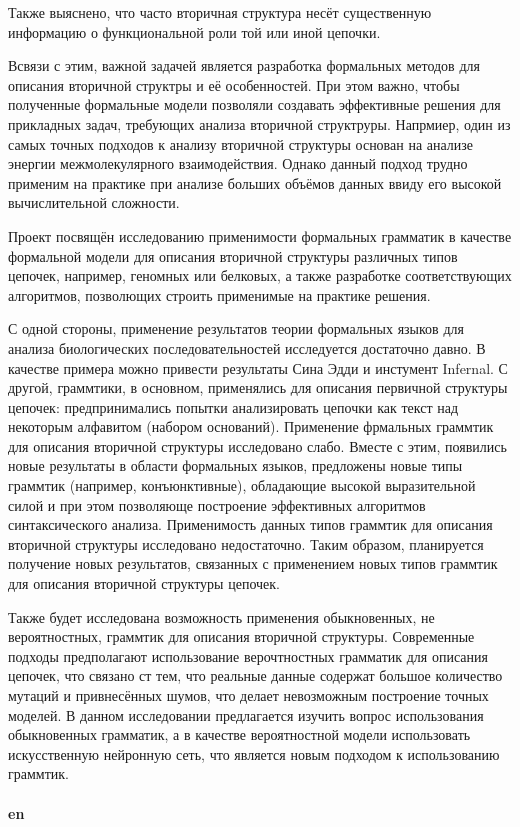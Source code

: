 \documentclass[12pt]{article}  %
\theoremstyle{remark}
\begin{document}
Также выяснено, что часто вторичная структура несёт существенную информацию о функциональной роли той или иной цепочки.

Всвязи с этим, важной задачей является разработка формальных методов для описания вторичной структры и её особенностей.
При этом важно, чтобы полученные формальные модели позволяли создавать эффективные решения для прикладных задач, требующих анализа вторичной структруры.
Напрмиер, один из самых точных подходов к анализу вторичной структуры основан на анализе энергии межмолекулярного взаимодействия.
Однако данный подход трудно применим на практике при анализе больших объёмов данных ввиду его высокой вычислительной сложности.

Проект посвящён исследованию применимости формальных грамматик в качестве формальной модели для описания вторичной структуры различных типов цепочек, например, геномных или белковых, а также разработке соответствующих алгоритмов, позволющих строить применимые на практике решения.

С одной стороны, применение результатов теории формальных языков для анализа биологических последовательностей исследуется достаточно давно.
В качестве примера можно привести результаты Сина Эдди и инстумент Infernal.
С другой, граммтики, в основном, применялись для описания первичной структуры цепочек: предпринимались попытки анализировать цепочки как текст над некоторым алфавитом (набором оснований).
Применение фрмальных граммтик для описания вторичной структуры исследовано слабо.
Вместе с этим, появились новые результаты в области формальных языков, предложены новые типы граммтик (например, конъюнктивные), обладающие высокой выразительной силой и при этом позволяюще построение эффективных алгоритмов синтаксического анализа.
Применимость данных типов граммтик для описания вторичной структуры исследовано недостаточно.
Таким образом, планируется получение новых результатов, связанных с применением новых типов граммтик для описания вторичной структуры цепочек.

Также будет исследована возможность применения обыкновенных, не вероятностных, граммтик для описания вторичной структуры.
Современные подходы предполагают использование верочтностных грамматик для описания цепочек, что связано ст тем, что реальные данные содержат большое количество мутаций и привнесённых шумов, что делает невозможным построение точных моделей.
В данном исследовании предлагается изучить вопрос использования обыкновенных грамматик, а в качестве вероятностной модели использовать искусственную нейронную сеть, что является новым подходом к использованию граммтик.
\\
\\
\textbf{en}\\
\end{document}
